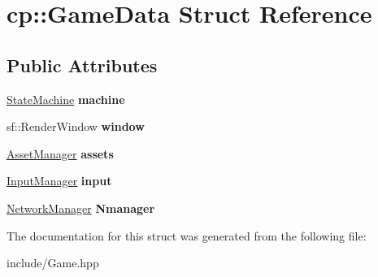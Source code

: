 \hypertarget{structcp_1_1_game_data}{}\section{cp\+:\+:Game\+Data Struct Reference}
\label{structcp_1_1_game_data}
\subsection*{Public Attributes}
\begin{DoxyCompactItemize}
\item 
\mbox{\label{structcp_1_1_game_data_a6a80ac77dcf3186e54f672c1b14bdb41}} 
\hyperlink{classcp_1_1_state_machine}{State\+Machine} {\bfseries machine}
\item 
\mbox{\label{structcp_1_1_game_data_a169d50257512a60497baf9f33471e4e7}} 
sf\+::\+Render\+Window {\bfseries window}
\item 
\mbox{\label{structcp_1_1_game_data_acf5734cc278e26e778d2bd47ea1317a4}} 
\hyperlink{classcp_1_1_asset_manager}{Asset\+Manager} {\bfseries assets}
\item 
\mbox{\label{structcp_1_1_game_data_ab43a0b7f11ee1c4a651e11b89450c092}} 
\hyperlink{classcp_1_1_input_manager}{Input\+Manager} {\bfseries input}
\item 
\mbox{\label{structcp_1_1_game_data_ac68bb9af43fdfb2e455ca1cebd209eb5}} 
\hyperlink{classcp_1_1_network_manager}{Network\+Manager} {\bfseries Nmanager}
\end{DoxyCompactItemize}


The documentation for this struct was generated from the following file\+:\begin{DoxyCompactItemize}
\item 
include/Game.\+hpp\end{DoxyCompactItemize}
